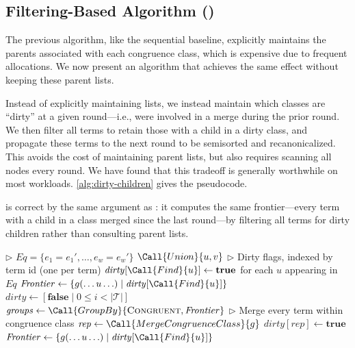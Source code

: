 \subsection{Filtering-Based Algorithm (\filteralgo)}

The previous algorithm, like the sequential baseline, explicitly maintains
the parents associated with each congruence class, which is expensive due
to frequent allocations. We now present an algorithm that achieves the same
effect without keeping these parent lists.

Instead of explicitly maintaining lists, we instead maintain which classes
are ``dirty'' at a given round---i.e., were involved in a merge during the
prior round. We then filter all terms to retain those with a child in a dirty
class, and propagate these terms to the next round to be semisorted and
recanonicalized. This avoids the
cost of maintaining parent lists, but also requires scanning all nodes every
round. We have found that this tradeoff is generally worthwhile on most
workloads. \autoref{alg:dirty-children} gives the pseudocode.

\filteralgo{} is correct by the same argument as \parentalgo{}: it computes
the same frontier---every term with a child in a class merged since the last
round---by filtering all terms for dirty children rather than consulting
parent lists.

\begin{algorithm}
\begin{algorithmic}[1]

        \State $\rhd$ $\mathit{Eq} = \{e_1 = e_1', \ldots, e_w = e_w'\}$
          \State $\Call{Union}{u, v}$
        \EndParFor
        \State $\rhd$ Dirty flags, indexed by term id (one per term)
        \State $\mathit{dirty}[\Call{Find}{u}] \gets \textbf{true}$ for each $u$ appearing in $\mathit{Eq}$
        \State $\mathit{Frontier} \gets \{g(\ldots u \ldots) \mid \mathit{dirty}[\Call{Find}{u}]\}$
          \State $\mathit{dirty} \gets [\textbf{false} \mid 0 \leq i < |\mathcal{T}|]$
          \State $\mathit{groups} \gets \Call{GroupBy}{\textsc{Congruent}, \mathit{Frontier}}$
            \State $\rhd$ Merge every term within congruence class
            \State $\mathit{rep} \gets \Call{MergeCongruenceClass}{g}$
            \State $\mathit{dirty}[\mathit{rep}] \gets \textbf{true}$
          \EndParFor
          \State $\mathit{Frontier} \gets \{g(\ldots u \ldots) \mid \mathit{dirty}[\Call{Find}{u}]\}$
        \EndWhile
    \EndFunction
\end{algorithmic}
\caption{\filteralgo: filtering-based bulk-synchronous algorithm}
\label{alg:dirty-children}
\end{algorithm}

